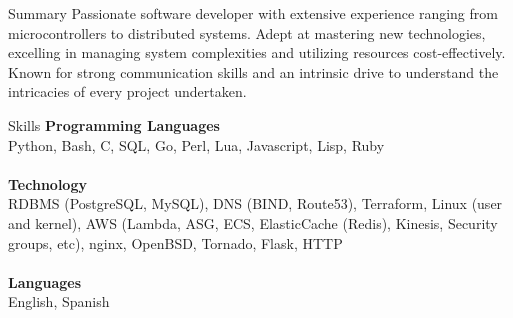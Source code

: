 \documentclass{resume} %
\begin{document}
\begin{rSection}{Summary}
Passionate software developer with extensive experience ranging
from microcontrollers to distributed systems. Adept at mastering new
technologies, excelling in managing system complexities and utilizing
resources cost-effectively. Known for strong communication skills and an
intrinsic drive to understand the intricacies of every project undertaken.
\end{rSection}

\begin{rSection}{Skills}
{\bf Programming Languages }
\\Python, Bash, C, SQL, Go, Perl, Lua, Javascript, Lisp, Ruby\\\\
{\bf Technology }
\\RDBMS (PostgreSQL, MySQL), DNS (BIND, Route53), Terraform, Linux
(user and kernel), AWS (Lambda, ASG, ECS, ElasticCache (Redis), Kinesis,
Security groups, etc), nginx, OpenBSD, Tornado, Flask, HTTP\\\\
{\bf Languages}
\\English, Spanish
\end{rSection}
\end{document}
